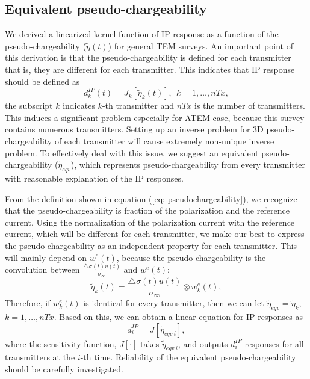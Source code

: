 \documentclass[a4paper, 11pt]{article}
\newcommand{\siginf}{\sigma_\infty}
\newcommand{\dsig}{\triangle\sigma}
\newcommand{\peta}{\tilde{\eta}}
\newcommand{\dip}{d^{IP}}
\begin{document}
\subsection{Equivalent pseudo-chargeability}
We derived a linearized kernel function of IP response as a function of the pseudo-chargeability ($\peta(t)$) for general TEM surveys. 
An important point of this derivation is that the pseudo-chargeability is defined for each transmitter that is, they are different for each transmitter. 
This indicates that IP response should be defined as 
\begin{equation}
  \dip_k(t) = J_k[\peta_k (t)], \ \ k=1, \ldots, nTx,
\end{equation}
the subscript $k$ indicates $k$-th transmitter and $nTx$ is the number of transmitters. This induces a significant problem especially for ATEM case, because this survey contains numerous transmitters.
Setting up an inverse problem for 3D pseudo-chargeability of each transmitter will cause extremely non-unique inverse problem. 
To effectively deal with this issue, we suggest an equivalent pseudo-chargeability ($\peta_{eqv}$), which represents pseudo-chargeability from every transmitter with reasonable explanation of the IP responses. 

From the definition shown in equation (\ref{eq: pseudochargeability}), we recognize that the pseudo-chargeability is fraction of the polarization and the reference current. 
Using the normalization of the polarization current with the reference current, which will be different for each transmitter, we make our best to express the pseudo-chargeability as an independent property for each transmitter. 
This will mainly depend on $w^e(t)$, because the pseudo-chargeability is the convolution between $\frac{\dsig(t)u(t)}{\siginf}$ and $w^e(t)$:
\begin{equation}
  \peta_k(t) = \frac{\dsig(t)u(t)}{\siginf} \otimes w^e_k(t),
  \label{eq: pseudochargeability_k}
\end{equation}
Therefore, if $w^e_k(t)$ is identical for every transmitter, then we can let $\peta_{eqv} = \peta_k$, $k=1, \ldots, nTx$. 
Based on this, we can obtain a linear equation for IP responses as
\begin{equation}
  \dip_i =J[\peta_{eqv \ i}],
  \label{eq: pseudochargeability_equivalent}
\end{equation}
where the sensitivity function, $J[\cdot]$ takes $\peta_{eqv \ i}$, and outputs $\dip_i$ responses for all transmitters at the $i$-th time. 
Reliability of the equivalent pseudo-chargeability should be carefully investigated. 
\end{document}
